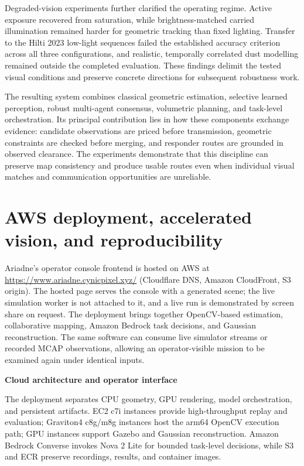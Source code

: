 \documentclass[10pt,a4paper]{article}
\newcommand{\indentedheading}[1]{\par\addvspace{0.65em}\noindent\hspace*{1em}\textbf{#1}\par\smallskip}
\begin{document}
Degraded-vision experiments further clarified the operating
regime. Active exposure recovered from saturation, while
brightness-matched carried illumination remained harder for
geometric tracking than fixed lighting. Transfer to the
Hilti 2023 low-light sequences failed the established accuracy
criterion across all three configurations, and realistic,
temporally correlated dust modelling remained outside the
completed evaluation. These findings delimit the tested
visual conditions and preserve concrete directions for
subsequent robustness work.

The resulting system combines classical geometric estimation,
selective learned perception, robust multi-agent consensus,
volumetric planning, and task-level orchestration. Its principal
contribution lies in how these components exchange evidence:
candidate observations are priced before transmission, geometric
constraints are checked before merging, and responder routes
are grounded in observed clearance. The experiments demonstrate
that this discipline can preserve map consistency and produce
usable routes even when individual visual matches and
communication opportunities are unreliable.



\section{AWS deployment, accelerated vision, and reproducibility}

Ariadne's operator console frontend is hosted on AWS at
\url{https://www.ariadne.cynicpixel.xyz/} (Cloudflare DNS, Amazon CloudFront,
S3 origin). The hosted page serves the console with a generated scene; the
live simulation worker is not attached to it, and a live run is
demonstrated by screen share on request. The deployment brings together OpenCV-based estimation,
collaborative mapping, Amazon Bedrock task decisions, and Gaussian
reconstruction. The same software can consume live simulator streams
or recorded MCAP observations, allowing an operator-visible mission
to be examined again under identical inputs.

\indentedheading{Cloud architecture and operator interface}

The deployment separates CPU geometry, GPU rendering, model
orchestration, and persistent artifacts. EC2 c7i instances provide
high-throughput replay and evaluation; Graviton4 c8g/m8g instances
host the arm64 OpenCV execution path; GPU instances support Gazebo
and Gaussian reconstruction. Amazon Bedrock Converse invokes Nova
2 Lite for bounded task-level decisions, while S3 and ECR preserve
recordings, results, and container images.
\end{document}
